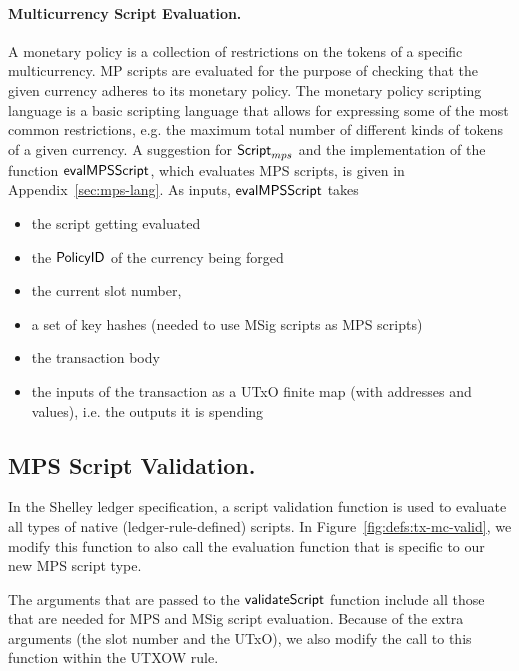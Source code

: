 \paragraph*{Multicurrency Script Evaluation.}
A monetary policy is a collection of restrictions on the tokens of a
specific multicurrency. MP scripts are evaluated for the purpose of checking that
the given currency adheres to its monetary policy. The monetary policy scripting
language is a basic scripting language that
allows for expressing some of the most common restrictions, e.g.
the maximum total number of different kinds of tokens of a given currency.
A suggestion for $\mathsf{Script}_{mps}$ and the implementation of the function
$\mathsf{evalMPSScript}$, which evaluates MPS scripts, is given in
Appendix~\ref{sec:mps-lang}. As inputs, $\mathsf{evalMPSScript}$ takes

\begin{itemize}
\item the script getting evaluated
\item the $\mathsf{PolicyID}$ of the currency being forged
\item the current slot number,
\item a set of key hashes (needed to use MSig scripts as MPS scripts)
\item the transaction body
\item the inputs of the transaction as a UTxO finite map (with addresses and values),
i.e. the outputs it is spending
\end{itemize}


\subsection*{MPS Script Validation.}

In the Shelley ledger specification, a script validation function
is used to evaluate all types of native (ledger-rule-defined) scripts.
In Figure~\ref{fig:defs:tx-mc-valid}, we modify this function to also call the
evaluation function that is specific to our new MPS script type.

The arguments that are passed to the $\mathsf{validateScript}$ function include all those
that are needed for MPS and MSig script evaluation. Because of the extra arguments
(the slot number and the UTxO), we also modify the call to this function
within the UTXOW rule.

